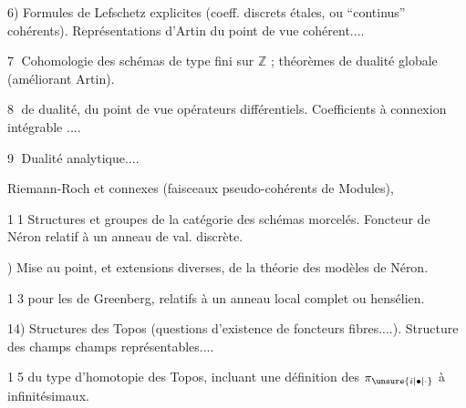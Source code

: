 6) Formules de Lefschetz explicites (coeff. discrets étales, ou ``continus'' cohérents). Représentations d'Artin du point de vue cohérent....

\textcircled{7} Cohomologie des schémas de type fini sur $\mathbb{Z}$ ; théorèmes de dualité globale  (améliorant Artin).

\textcircled{8}  de dualité, du point de vue opérateurs différentiels. Coefficients à connexion intégrable .... 

\textcircled{9} Dualité analytique....

Riemann-Roch et  connexes (faisceaux pseudo-cohérents de Modules),  

\textcircled{\small 11} Structures et groupes de la catégorie des schémas morcelés. Foncteur de Néron relatif à un anneau de val. discrète.

)%
\hspace{.4em}Mise au point, et extensions diverses, de la théorie des modèles de Néron. \hfill
\begin{minipage}[c]{1.8em}\end{minipage}

\textcircled{\small 13}%
\hspace{.4em}  pour les  de Greenberg, relatifs à un anneau local  complet ou hensélien.

14) Structures des Topos (questions d'existence de foncteurs fibres....). Structure des champs champs représentables.... \hfill
\begin{minipage}[c]{1.8em}\end{minipage}

\textcircled{\small 15}%
\hspace{.4em} du type d'homotopie des Topos, incluant une définition des $\pi_{\unsure{i|\bullet|\cdot}}$ à   infinitésimaux. 

